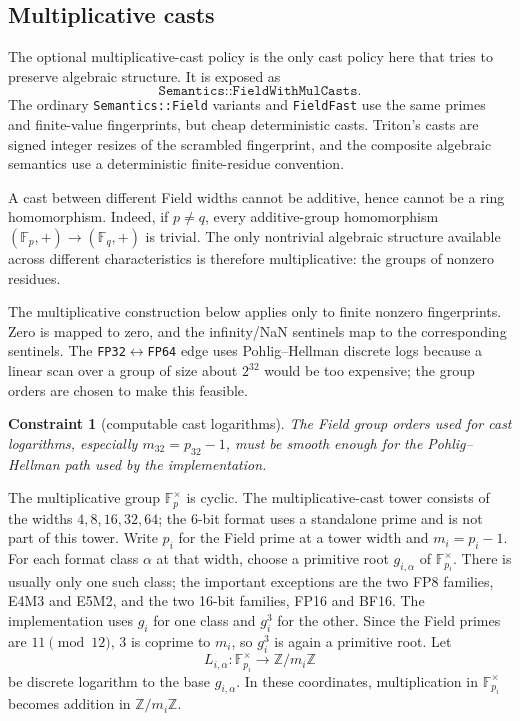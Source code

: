 \documentclass[11pt]{article}
\newcommand{\Z}{\mathbb{Z}}
\newcommand{\F}{\mathbb{F}}
\newcommand{\FieldFast}{\texttt{FieldFast}}
\theoremstyle{plain}
\newtheorem{constraint}{Constraint}
\begin{document}
\subsection{Multiplicative casts}

The optional multiplicative-cast policy is the only cast policy here that tries
to preserve algebraic structure.  It is exposed as
\[
  \texttt{Semantics::FieldWithMulCasts}.
\]
The ordinary \texttt{Semantics::Field} variants and \FieldFast{} use the same
primes and finite-value fingerprints, but cheap deterministic casts.  Triton's
casts are signed integer resizes of the scrambled fingerprint, and the composite
algebraic semantics use a deterministic finite-residue convention.

A cast between different Field widths cannot be additive, hence cannot be a
ring homomorphism.  Indeed, if \(p\ne q\), every additive-group homomorphism
\((\F_p,+)\to(\F_q,+)\) is trivial.  The only nontrivial algebraic structure
available across different characteristics is therefore multiplicative: the
groups of nonzero residues.

The multiplicative construction below applies only to finite nonzero
fingerprints.  Zero is mapped to zero, and the infinity/NaN sentinels map to the
corresponding sentinels.  The \texttt{FP32}\(\leftrightarrow\)\texttt{FP64} edge
uses Pohlig--Hellman discrete logs because a linear scan over a group of size
about \(2^{32}\) would be too expensive; the group orders are chosen to make this
feasible.

\begin{constraint}[computable cast logarithms]
\label{con:cast-log}
The Field group orders used for cast logarithms, especially
\(m_{32}=p_{32}-1\), must be smooth enough for the Pohlig--Hellman path used by
the implementation.
\end{constraint}

The multiplicative group \(\F_p^\times\) is cyclic.  The multiplicative-cast
tower consists of the widths \(4,8,16,32,64\); the 6-bit format uses a
standalone prime and is not part of this tower.  Write \(p_i\) for the Field
prime at a tower width and \(m_i=p_i-1\).  For each format class \(\alpha\) at
that width, choose a primitive root \(g_{i,\alpha}\) of
\(\F_{p_i}^\times\).  There is usually only one such class; the important
exceptions are the two FP8 families, E4M3 and E5M2, and the two 16-bit
families, FP16 and BF16.  The implementation uses \(g_i\) for one class and
\(g_i^3\) for the other.  Since the Field primes are \(11\pmod {12}\), \(3\) is
coprime to \(m_i\), so \(g_i^3\) is again a primitive root.  Let
\[
  L_{i,\alpha}:\F_{p_i}^{\times}\to\Z/m_i\Z
\]
be discrete logarithm to the base \(g_{i,\alpha}\).  In these coordinates,
multiplication in \(\F_{p_i}^{\times}\) becomes addition in \(\Z/m_i\Z\).
\end{document}
